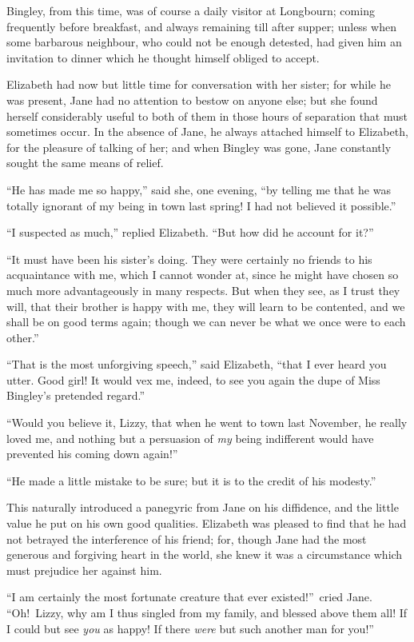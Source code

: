 \documentclass[12pt,english,oneside]{book}
\begin{document}
Bingley, from this time, was of course a daily visitor at Longbourn;
coming frequently before breakfast, and always remaining till after
supper; unless when some barbarous neighbour, who could not be enough
detested, had given him an invitation to dinner which he thought himself
obliged to accept.

Elizabeth had now but little time for conversation with her sister;
for while he was present, Jane had no attention to bestow on anyone
else; but she found herself considerably useful to both of them in
those hours of separation that must sometimes occur. In the absence
of Jane, he always attached himself to Elizabeth, for the pleasure
of talking of her; and when Bingley was gone, Jane constantly sought
the same means of relief.

{}``He has made me so happy,'' said she, one evening, {}``by telling
me that he was totally ignorant of my being in town last spring! I
had not believed it possible.''

{}``I suspected as much,'' replied Elizabeth. {}``But how did he
account for it?''\ 

{}``It must have been his sister's doing. They were certainly no
friends to his acquaintance with me, which I cannot wonder at, since
he might have chosen so much more advantageously in many respects.
But when they see, as I trust they will, that their brother is happy
with me, they will learn to be contented, and we shall be on good
terms again; though we can never be what we once were to each other.''

{}``That is the most unforgiving speech,'' said Elizabeth, {}``that
I ever heard you utter. Good girl! It would vex me, indeed, to see
you again the dupe of Miss Bingley's pretended regard.''

{}``Would you believe it, Lizzy, that when he went to town last November,
he really loved me, and nothing but a persuasion of \textit{my} being
indifferent would have prevented his coming down again!''

{}``He made a little mistake to be sure; but it is to the credit
of his modesty.''

This naturally introduced a panegyric from Jane on his diffidence,
and the little value he put on his own good qualities. Elizabeth was
pleased to find that he had not betrayed the interference of his friend;
for, though Jane had the most generous and forgiving heart in the
world, she knew it was a circumstance which must prejudice her against
him.

{}``I am certainly the most fortunate creature that ever existed!''\
cried Jane. {}``Oh!\ Lizzy, why am I thus singled from my family,
and blessed above them all! If I could but see \textit{you} as happy!
If there \textit{were} but such another man for you!''
\end{document}
